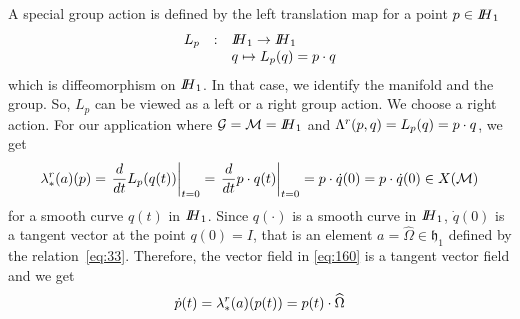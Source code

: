 A special group action is defined by the left translation map for a point $p \in \mbox{\rm $I\!\!H$}_1$ 
\begin{equation}
  \label{eq:159}
  \begin{array}[lcl]{rcl}
    L_p& :&   \HH_1 \rightarrow  \HH_1\\
       & &  q  \mapsto L_p(q) = p \glaw q\\
  \end{array}
\end{equation}
which is diffeomorphism on $\mbox{\rm $I\!\!H$}_1$. In that case, we identify the manifold and the group. So, $L_p$ can be viewed as a left or a right group action. We choose a right action. For our application where $\mathcal G = \mathcal M = \mbox{\rm $I\!\!H$}_1$ and $\Lambda^r(p,q) = L_{p}(q) =  p \cdot q $, we get
\begin{equation}
  \label{eq:160}
   \lambda^r_{*}(a)(p) = \left. \frac{d}{dt} L_{p}(q(t)) \right|_{t=0}  = \left. \frac{d}{dt} p \cdot q(t) \right|_{t=0} =  p \cdot \dot q(0) = p  \cdot \dot q(0)  \in X(\mathcal M)
 \end{equation}
 for a smooth curve $q(t)$ in $\mbox{\rm $I\!\!H$}_1$.
Since $q(\cdot)$ is a smooth curve in $\mbox{\rm $I\!\!H$}_1$, $\dot q(0)$ is a tangent vector at the point $q(0)=I$, that is an element $a = \widehat  \Omega  \in \mathfrak h_1 $ defined by the relation~\eqref{eq:33}. Therefore, the vector field in \eqref{eq:160} is a tangent vector field and we get
\begin{equation}
  \label{eq:161}
  \dot p(t) = \lambda^r_{*}(a)(p(t)) = p(t)  \cdot \widehat \Omega
\end{equation}
